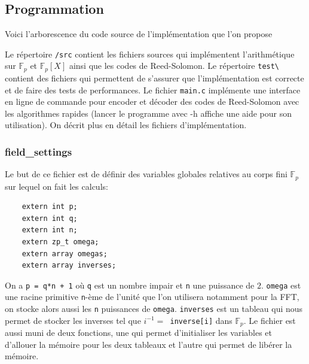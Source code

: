 \documentclass{article}
\theoremstyle{definition}
\theoremstyle{remark}
\begin{document}
\newpage

\subsection{Programmation}

Voici l'arborescence du code source de l'implémentation que l'on propose

\vspace{0.5cm}


\vspace{0.5cm}

Le répertoire \verb|/src| contient les fichiers sources qui implémentent l'arithmétique sur $\mathbb{F}_p$ et $\mathbb{F}_p[X]$ ainsi que les codes de Reed-Solomon. Le répertoire \verb|test\| contient des fichiers qui permettent de s'assurer que l'implémentation est correcte et de faire des tests de performances. Le fichier \verb|main.c| implémente une interface en ligne de commande pour encoder et décoder des codes de Reed-Solomon avec les algorithmes rapides (lancer le programme avec -h affiche une aide pour son utilisation). On décrit plus en détail les fichiers d'implémentation. 

\subsubsection{field\_settings}

Le but de ce fichier est de définir des variables globales relatives au corps fini $\mathbb{F}_p$ sur lequel on fait les calculs:

\begin{verbatim}
    extern int p;
    extern int q;
    extern int n;
    extern zp_t omega;
    extern array omegas;
    extern array inverses;
\end{verbatim}

On a \verb|p = q*n + 1| où \verb|q| est un nombre impair et \verb|n| une puissance de $2$. \verb|omega| est une racine primitive \verb|n|-ème de l'unité que l'on utilisera notamment pour la FFT, on stocke alors aussi les \verb|n| puissances de \verb|omega|. \verb|inverses| est un tableau qui nous permet de stocker les inverses tel que $i^{-1} =$\verb| inverse[i]| dans $\mathbb{F}_p$. Le fichier est aussi muni de deux fonctions, une qui permet d'initialiser les variables et d'allouer la mémoire pour les deux tableaux et l'autre qui permet de libérer la mémoire.
\end{document}
